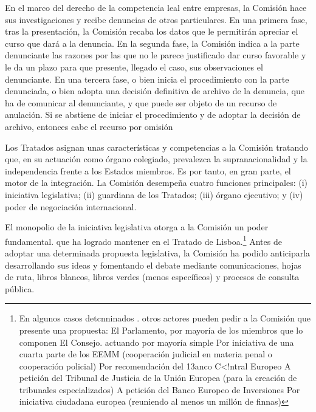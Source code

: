 \documentclass[10pt,a4paper]{article}
\begin{document}
En el marco del derecho de la competencia leal entre empresas, la Comisión hace sus investigaciones y recibe denuncias de otros particulares. En una primera fase, tras la presentación, la Comisión recaba los datos que le permitirán apreciar el curso que dará a la denuncia. En la segunda fase, la Comisión indica a la parte  denunciante las razones por las que no le parece justificado dar curso favorable y le da un plazo para que presente, llegado el caso, sus observaciones el denunciante. En una tercera fase, o bien inicia el procedimiento con la parte denunciada, o bien adopta una decisión definitiva de archivo de la denuncia, que ha de comunicar al denunciante, y que puede ser objeto de un recurso de anulación. Si se abstiene de iniciar el procedimiento y de adoptar la decisión de archivo, entonces cabe el recurso por omisión
































Los Tratados asignan unas características y competencias a la Comisión tratando que, en su actuación como órgano colegiado, prevalezca la supranacionalidad y la independencia frente a los Estados miembros. Es por tanto, en gran parte, el motor de la integración. La Comisión desempeña cuatro funciones principales: (i) iniciativa legislativa; (ii) guardiana de los Tratados; (iii) órgano ejecutivo; y (iv) poder de negociación internacional.

El monopolio de la iniciativa legislativa otorga a la Comisión un poder fundamental. que ha logrado mantener en el Tratado de Lisboa.\footnote{
En algunos casos detcnninados . otros actores pueden pedir a la Comisión que presente una propuesta: El Parlamento, por mayoría de los miembros que lo componen El Consejo. actuando por mayoría simple Por iniciativa de una cuarta parte de los EEMM (cooperación judicial en materia penal o cooperación policial) Por recomendación del 13anco C<!ntral Europeo A petición del Tribunal de Justicia de la Unión Europea (para la creación de tribunales especializados) A petición del Banco Europeo de Inversiones Por iniciativa ciudadana europea (reuniendo al menos un millón de finnas)
} Antes de adoptar una determinada propuesta legislativa, la Comisión ha podido anticiparla desarrollando sus ideas y fomentando el debate mediante comunicaciones, hojas de ruta, libros blancos, libros verdes (menos específicos) y procesos de consulta pública. 
\end{document}

